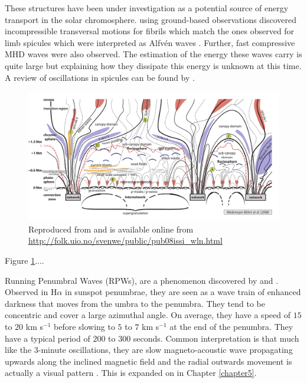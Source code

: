     These structures have been under investigation as a potential source of energy transport in the solar chromosphere.
    \cite{Morton2012} using ground-based observations discovered incompressible transversal motions for fibrils which match the ones observed for limb spicules which were interpreted as Alfv\'en waves \citep{DePontieu2007}.
    Further, fast compressive MHD waves were also observed.
    The estimation of the energy these waves carry is quite large but explaining how they dissipate this energy is unknown at this time.
    A review of oscillations in spicules can be found by \cite{Zaqarashvili2009}. 

    \begin{figure}
    	\centering
    	\includegraphics[width=\textwidth]{internetwork_sketch.pdf}
    	\caption{
		    	Reproduced from \cite{Sven} and is available online from \url{http://folk.uio.no/svenwe/public/pub08issi_wln.html}
		    	}
    	\label{fig:chromo_field}
    \end{figure}
            
    Figure \ref{fig:chromo_field}....
      
    Running Penumbral Waves (RPWs), are a phenomenon discovered by \cite{Zirin1972} and \cite{Giovanelli1972}. 
    Observed in H$\alpha$ in sunspot penumbrae, they are seen as a wave train of enhanced darkness that moves from the umbra to the penumbra.
    They tend to be concentric and cover a large azimuthal angle.
    On average, they have a speed of $15$ to $20$ km s$^{-1}$ before slowing to $5$ to $7$ km s$^{-1}$ at the end of the penumbra.
    They have a typical period of $200$ to $300$ seconds. 
    Common interpretation is that much like the $3$-minute oscillations, they are slow magneto-acoustic wave propagating upwards along the inclined magnetic field and the radial outwards movement is actually a visual pattern \citep{UTMO,ORWS,OASO}.
    This is expanded on in Chapter \ref{chapter5}.
    
